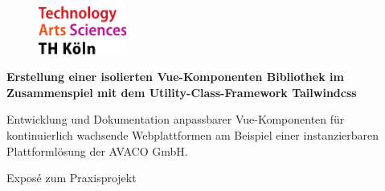 \begin{titlepage}

\begin{center}

\begin{figure}[!ht]
		\includegraphics[width=0.26\textwidth]{images/THlogoheader.pdf}
\end{figure}

\vspace{1.5cm}

\begin{rmfamily}
\begin{huge}
\textbf{ Erstellung einer isolierten Vue-Komponenten Bibliothek im Zusammenspiel mit dem Utility-Class-Framework Tailwindcss}\\	
\end{huge}
\vspace{0.5cm}
\begin{LARGE}
Entwicklung und Dokumentation anpassbarer Vue-Komponenten für kontinuierlich wachsende Webplattformen am Beispiel einer instanzierbaren Plattformlösung der AVACO GmbH. \\
\end{LARGE}
\end{rmfamily}

\vspace{0.8cm}



\begin{LARGE}
\begin{scshape}
Exposé zum Praxisprojekt\\[0.8em]
\end{scshape}
\end{LARGE}


\end{center}
\end{titlepage}
